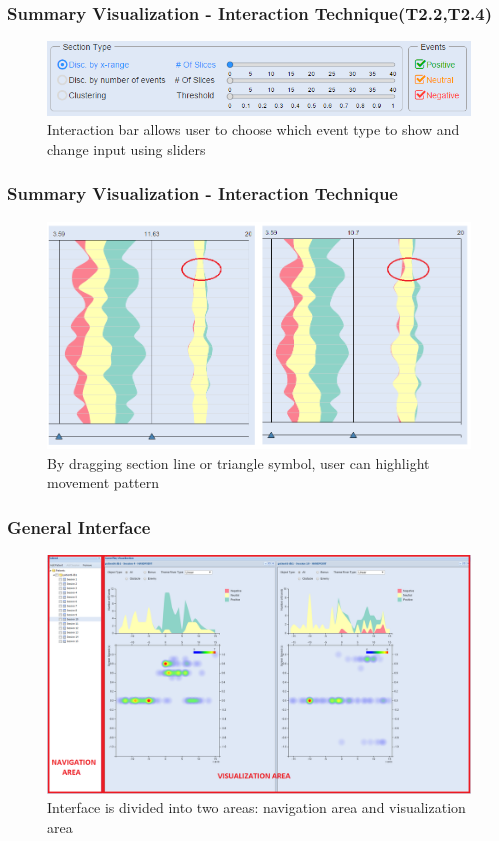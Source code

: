 \documentclass[xcolor=table]{beamer}
\begin{document}
\begin{frame}
\frametitle{Summary Visualization - Interaction Technique(T2.2,T2.4)}
\begin{figure}
\includegraphics[scale=0.6]{images/interaction_bar.png}
\caption{Interaction bar allows user to choose which event type to show and change input using sliders}
\end{figure}
\end{frame}

\begin{frame}
\frametitle{Summary Visualization - Interaction Technique}
\begin{figure}
\includegraphics[scale=0.4]{images/line_dragging.png}
\caption{By dragging section line or triangle symbol, user can highlight movement pattern }
\end{figure}
\end{frame}
\begin{frame}
\frametitle{General Interface}
\begin{figure}
\includegraphics[scale=0.2]{images/interface_app_compare.png}
\caption{Interface is divided into two areas: navigation area and visualization area}
\end{figure}
\end{frame}
\end{document}
